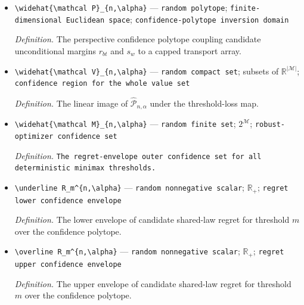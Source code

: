 \documentclass{article}
\begin{document}
\begin{itemize}
  \item \texttt{\textbackslash{}\allowbreak{}widehat\{\textbackslash{}\allowbreak{}mathcal P\}\allowbreak{}\_\allowbreak{}\{n,\allowbreak{}\textbackslash{}\allowbreak{}alpha\}\allowbreak{}} --- \texttt{random polytope}; \texttt{finite-\allowbreak{}dimensional Euclidean space}; \texttt{confidence-\allowbreak{}polytope inversion domain}
  \par\smallskip\noindent\emph{Definition.} The perspective confidence polytope coupling candidate unconditional margins \(r_{bt}\) and \(s_w\) to a capped transport array.
  \item \texttt{\textbackslash{}\allowbreak{}widehat\{\textbackslash{}\allowbreak{}mathcal V\}\allowbreak{}\_\allowbreak{}\{n,\allowbreak{}\textbackslash{}\allowbreak{}alpha\}\allowbreak{}} --- \texttt{random compact set}; subsets of \(\mathbb R^{|\mathcal M|}\); \texttt{confidence region for the whole value set}
  \par\smallskip\noindent\emph{Definition.} The linear image of \(\widehat{\mathcal P}_{n,\alpha}\) under the threshold-loss map.
  \item \texttt{\textbackslash{}\allowbreak{}widehat\{\textbackslash{}\allowbreak{}mathcal M\}\allowbreak{}\_\allowbreak{}\{n,\allowbreak{}\textbackslash{}\allowbreak{}alpha\}\allowbreak{}} --- \texttt{random finite set}; \(2^{\mathcal M}\); \texttt{robust-\allowbreak{}optimizer confidence set}
  \par\smallskip\noindent\emph{Definition.} \texttt{The regret-\allowbreak{}envelope outer confidence set for all deterministic minimax thresholds.}
  \item \texttt{\textbackslash{}\allowbreak{}underline R\_\allowbreak{}m\textasciicircum{}\{n,\allowbreak{}\textbackslash{}\allowbreak{}alpha\}\allowbreak{}} --- \texttt{random nonnegative scalar}; \(\mathbb R_+\); \texttt{regret lower confidence envelope}
  \par\smallskip\noindent\emph{Definition.} The lower envelope of candidate shared-law regret for threshold \(m\) over the confidence polytope.
  \item \texttt{\textbackslash{}\allowbreak{}overline R\_\allowbreak{}m\textasciicircum{}\{n,\allowbreak{}\textbackslash{}\allowbreak{}alpha\}\allowbreak{}} --- \texttt{random nonnegative scalar}; \(\mathbb R_+\); \texttt{regret upper confidence envelope}
  \par\smallskip\noindent\emph{Definition.} The upper envelope of candidate shared-law regret for threshold \(m\) over the confidence polytope.

\end{itemize}
\end{document}
